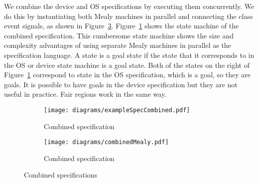 We combine the device and OS specifications by executing them concurrently. We do this by instantiating both Mealy machines in parallel and connecting the class event signals, as shown in Figure~\ref{fig:combined_spec_mealy}. Figure~\ref{fig:combined_spec} shows the state machine of the combined specification. This cumbersome state machine shows the size and complexity advantages of using separate Mealy machines in parallel as the specification language. A state is a goal state if the state that it corresponds to in the OS or device state machine is a goal state. Both of the states on the right of Figure~\ref{fig:combined_spec} correspond to state  in the OS specification, which is a goal, so they are goals. It is possible to have goals in the device specification but they are not useful in practice. Fair regions work in the same way.

\begin{figure}
\centering
\begin{subfigure}[t]{0.47\textwidth}
\texttt{[image: diagrams/exampleSpecCombined.pdf]}
\caption{Combined specification}
\label{fig:combined_spec}
\end{subfigure}
\hfill
\begin{subfigure}[t]{0.47\textwidth}
\texttt{[image: diagrams/combinedMealy.pdf]}
\caption{Combined specification}
\label{fig:combined_spec_mealy}
\end{subfigure}
\caption{Combined specifications}
\end{figure}

